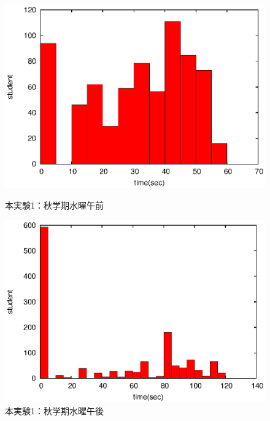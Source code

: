 \documentclass[a4paper,10pt]{jarticle}
\begin{document}
\begin{figure}[htpb]                        
\begin{minipage} {0.5\hsize}                             
\begin{center}                              
\includegraphics[bb=0 0 390 248,clip,width=\hsize]{xWe12_hist.eps}   
\caption{本実験1：秋学期水曜午前}                              
\label{xWe12}                                
\end{center}                                    
\end{minipage}                                 
\begin{minipage}{0.5\hsize}                                            
\begin{center}                              
\includegraphics[bb=0 0 390 248,clip,width=\hsize]{xWe345_hist.eps}   
\caption{本実験1：秋学期水曜午後}                              
\label{xWe345}                                
\end{center}                                    
\end{minipage}                                 
\end{figure}                                 
\end{document}
